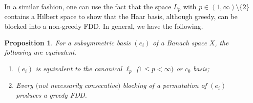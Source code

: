 \documentclass[12pt,leqno]{amsart}
\newtheorem{proposition}[theorem]{Proposition}
\numberwithin{equation}{section}
\theoremstyle{definition}
\begin{document}
In a similar fashion, one can use the fact that the space $L_p$ with $p\in (1,\infty)\setminus\{2\}$ contains a Hilbert space to show that the Haar basis, although greedy, can be blocked into a non-greedy FDD. In general, we have the following.
\begin{proposition}\label{Rearrange greedy}
For a subsymmetric basis $(e_i)$ of a Banach space $X$, the following are equivalent.
\begin{enumerate}
    \item $(e_i)$ is equivalent to the canonical $\ell_p$ ($1\leq p<\infty)$ or $c_0$ basis;
    \item Every $($not necessarily consecutive$)$ blocking of a permutation of $(e_i)$ produces a greedy FDD.
\end{enumerate}
\end{proposition}
\end{document}
